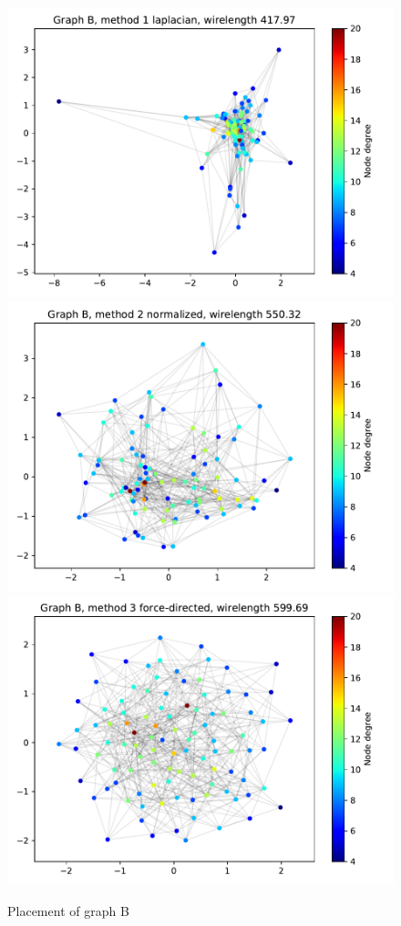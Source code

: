 \documentclass[a4paper,twocolumn]{article}
\begin{document}
\begin{figure}[h]
	\centering
	\includegraphics[width=\columnwidth]{fig/B/laplacian.pdf}
	\includegraphics[width=\columnwidth]{fig/B/norm.pdf}
	\includegraphics[width=\columnwidth]{fig/B/spring.pdf}
	\caption{Placement of graph B}
	\label{fig:graphB}
\end{figure}
\end{document}
